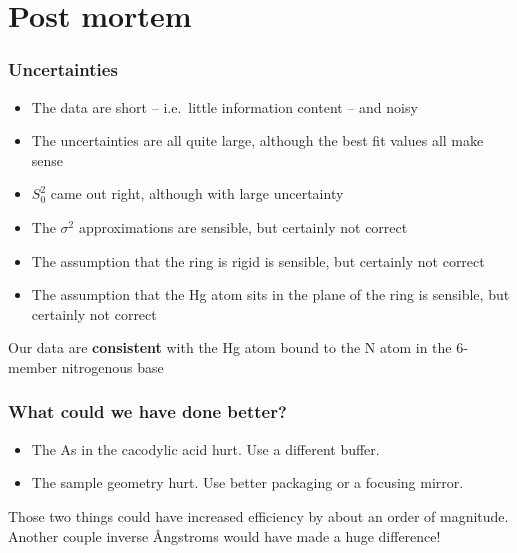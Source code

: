 \documentclass[10pt, xcolor=x11names, compress]{beamer}
\begin{document}
\section{Post mortem}

\begin{frame}
  \frametitle{Uncertainties}
  \begin{itemize}
  \item The data are short -- i.e.\ little information content -- and
    noisy
  \item The uncertainties are all quite large, although the best fit
    values all make sense
  \item $S_0^2$ came out right, although with large uncertainty
  \item The $\sigma^2$ approximations are sensible, but certainly not correct
  \item The assumption that the ring is rigid is sensible, but
    certainly not correct
  \item The assumption that the Hg atom sits in the plane of the ring
    is sensible, but certainly not correct
  \end{itemize}

  \begin{block}{}
    Our data are \textbf{consistent} with the Hg atom bound to the N
    atom in the 6-member nitrogenous base
  \end{block}
\end{frame}

\begin{frame}
  \frametitle{What could we have done better?}
  \begin{itemize}
  \item The As in the cacodylic acid hurt.  Use a different buffer.
  \item The sample geometry hurt.  Use better packaging or a focusing mirror.
  \end{itemize}

  \bigskip

  \begin{block}{}
    Those two things could have increased efficiency by about an order
    of magnitude.  Another couple inverse {\AA}ngstroms would have
    made a huge difference!
  \end{block}
\end{frame}
\end{document}
